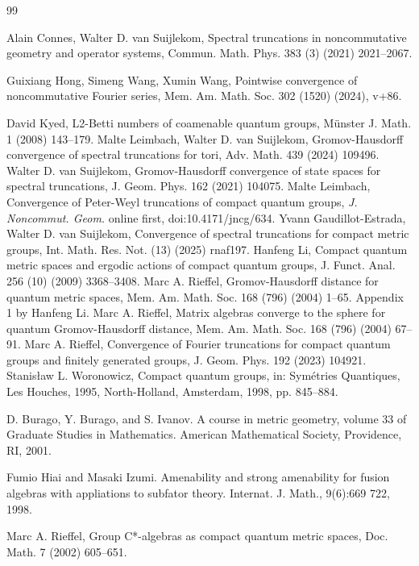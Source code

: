 \documentclass[12pt, reqno]{amsart}
\theoremstyle{definition}
\theoremstyle{remark}
\numberwithin{equation}{section}
\begin{document}

\begin{thebibliography}{99}

Alain Connes, Walter D. van Suijlekom, Spectral truncations in noncommutative geometry and
operator systems, Commun. Math. Phys. 383 (3) (2021) 2021--2067.


   Guixiang Hong, Simeng Wang, Xumin Wang, Pointwise convergence of noncommutative Fourier
series, Mem. Am. Math. Soc. 302 (1520) (2024), v+86.

 David Kyed, L2-Betti numbers of coamenable quantum groups, Münster J. Math. 1 (2008) 143--179.
 Malte Leimbach, Walter D. van Suijlekom, Gromov-Hausdorff convergence of spectral truncations
for tori, Adv. Math. 439 (2024) 109496.
 Walter D. van Suijlekom, Gromov-Hausdorff convergence of state spaces for spectral truncations,
J. Geom. Phys. 162 (2021) 104075.
 Malte Leimbach, Convergence of Peter-Weyl truncations of compact quantum groups, \textit{J. Noncommut. Geom.} online first, doi:10.4171/jncg/634.
Yvann Gaudillot-Estrada, Walter D. van Suijlekom, Convergence of spectral truncations for compact
metric groups, Int. Math. Res. Not. (13) (2025) rnaf197.
Hanfeng Li, Compact quantum metric spaces and ergodic actions of compact quantum groups, J.
Funct. Anal. 256 (10) (2009) 3368--3408.
Marc A. Rieffel, Gromov-Hausdorff distance for quantum metric spaces, Mem. Am. Math. Soc.
168 (796) (2004) 1--65. Appendix 1 by Hanfeng Li.
 Marc A. Rieffel, Matrix algebras converge to the sphere for quantum Gromov-Hausdorff distance,
Mem. Am. Math. Soc. 168 (796) (2004) 67--91.
Marc A. Rieffel, Convergence of Fourier truncations for compact quantum groups and finitely generated groups, J. Geom. Phys. 192 (2023) 104921.
Stanisław L. Woronowicz, Compact quantum groups, in: Symétries Quantiques, Les Houches, 1995,
North-Holland, Amsterdam, 1998, pp. 845--884.

D. Burago, Y. Burago, and S. Ivanov. A course in metric geometry, volume 33 of Graduate
Studies in Mathematics. American Mathematical Society, Providence, RI, 2001.

Fumio Hiai and Masaki Izumi. Amenability and strong amenability for fusion algebras with appliations to subfator theory. Internat. J. Math.,
9(6):669 722, 1998.

Marc A. Rieffel, Group C*-algebras as compact quantum metric spaces, Doc. Math. 7 (2002)
605--651.


\end{thebibliography}
\end{document}
